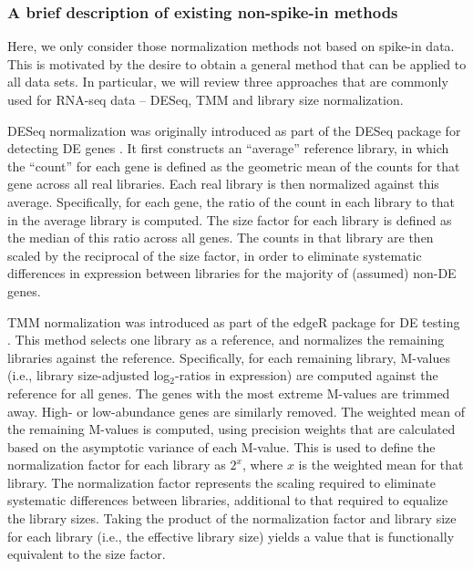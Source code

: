 \documentclass{bmcart}
\begin{document}
\subsubsection*{A brief description of existing non-spike-in methods}
Here, we only consider those normalization methods not based on spike-in data.
This is motivated by the desire to obtain a general method that can be applied to all data sets.
In particular, we will review three approaches that are commonly used for RNA-seq data -- DESeq, TMM and library size normalization.

DESeq normalization was originally introduced as part of the DESeq package for detecting DE genes \cite{anders2010differential}.
It first constructs an ``average'' reference library, in which the ``count'' for each gene is defined as the geometric mean of the counts for that gene across all real libraries.
Each real library is then normalized against this average.
Specifically, for each gene, the ratio of the count in each library to that in the average library is computed.
The size factor for each library is defined as the median of this ratio across all genes.
The counts in that library are then scaled by the reciprocal of the size factor,
    in order to eliminate systematic differences in expression between libraries for the majority of (assumed) non-DE genes.

TMM normalization was introduced as part of the edgeR package for DE testing \cite{robinson2010edgeR}.
This method selects one library as a reference, and normalizes the remaining libraries against the reference.
Specifically, for each remaining library, M-values (i.e., library size-adjusted log$_2$-ratios in expression) are computed against the reference for all genes.
The genes with the most extreme M-values are trimmed away.
High- or low-abundance genes are similarly removed.
The weighted mean of the remaining M-values is computed, using precision weights that are calculated based on the asymptotic variance of each M-value.
This is used to define the normalization factor for each library as $2^x$, where $x$ is the weighted mean for that library.
The normalization factor represents the scaling required to eliminate systematic differences between libraries, additional to that required to equalize the library sizes.
Taking the product of the normalization factor and library size for each library (i.e., the effective library size) yields a value that is functionally equivalent to the size factor.
\end{document}
